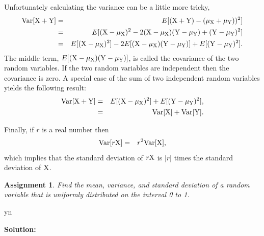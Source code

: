 \documentclass[12pt]{article}
\def\solutions{y}
\def\solutions{n}
\newtheorem{assignment}{Assignment}[section]
\begin{document}
Unfortunately calculating the variance can be a little more tricky,
\begin{eqnarray*}
  \mathrm{Var}[{\rm X} + {\rm Y}] & = & 
  E[({\rm X}+{\rm Y}) - (\mu_{\rm X}+\mu_{\rm Y}))^2] \\
  & = & E[({\rm X}-\mu_{\rm X})^2 -
          2({\rm X}-\mu_{\rm X})({\rm Y}-\mu_{\rm Y})+
          ({\rm Y}-\mu_{\rm Y})^2] \\
  & = & E[({\rm X}-\mu_{\rm X})^2] -
        2E[({\rm X}-\mu_{\rm X})({\rm Y}-\mu_{\rm Y})]+
        E[({\rm Y}-\mu_{\rm Y})^2].
\end{eqnarray*}
The middle term, $E[({\rm X}-\mu_{\rm X})({\rm Y}-\mu_{\rm Y})]$, is
called the covariance of the two random variables. If the two random
variables are independent then the covariance is zero. A special case
of the sum of two independent random variables yields the following
result:
\begin{eqnarray}
  \label{eqn:varianceSumTwo}
  \mathrm{Var}[{\rm X} + {\rm Y}] 
  & = & E[({\rm X}-\mu_{\rm X})^2] + E[({\rm Y}-\mu_{\rm Y})^2], \\
  & = & \mathrm{Var}[{\rm X}] + \mathrm{Var}[{\rm Y}].
                                \nonumber
\end{eqnarray}

Finally, if $r$ is a real number then
\begin{eqnarray}
  \label{eqn:varianceScaled}
  \mathrm{Var}[r{\rm X}] & = & r^2 \mathrm{Var}[{\rm X}],
\end{eqnarray}
which implies that the standard deviation of $r{\rm X}$ is $|r|$ times
the standard deviation of ${\rm X}$.


\begin{assignment}
  Find the mean, variance, and standard deviation of a random variable
  that is uniformly distributed on the interval 0 to 1.
\end{assignment}

\if y\solutions

\textbf{Solution:}
\end{document}
